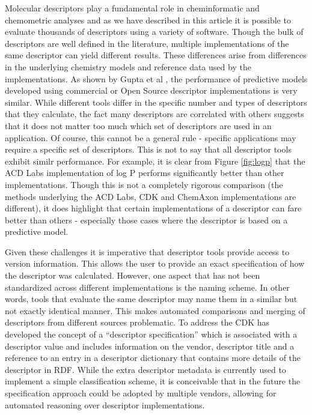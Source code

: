 \documentclass[letterpaper, 12pt]{article}
\begin{document}
Molecular descriptors play a fundamental role in cheminformatic and
chemometric analyses and as we have described in this article it is
possible to evaluate thousands of descriptors using a variety of
software. Though the bulk of descriptors are well defined in the
literature, multiple implementations of the same descriptor can yield
different results. These differences arise from differences in the
underlying chemistry models and reference data used by the
implementations. As shown by Gupta et al \cite{Gupta:2010uq},
the performance of predictive models developed using commercial or
Open Source descriptor implementations is very similar. While
different tools differ in the specific number and types of descriptors
that they calculate, the fact many descriptors are correlated with
others suggests that it does not matter too much which set of
descriptors are used in an application. Of course, this cannot be a
general rule - specific applications may require a specific set of
descriptors. This is not to say that all descriptor tools exhibit
similr performance. For example, it is clear from Figure \ref{fig:logp}
that the ACD Labs implementation of log P performs significantly
better than other implementations. Though this is not a completely
rigorous comparison (the methods underlying the ACD Labs, CDK and
ChemAxon implementations are different), it does highlight that
certain implementations of a descriptor can fare better than others -
especially those cases where the descriptor is based on a predictive
model. 

Given these challenges it is imperative that descriptor tools provide
access to version information. This allows the user to provide an
exact specification of how the descriptor was calculated. However, one
aspect that has not been standardized across different implementations
is the naming scheme. In other words, tools that evaluate the same
descriptor may name them in a similar but not exactly identical
manner. This makes automated comparisons and merging of descriptors
from different sources problematic. To address the CDK has developed
the concept of a ``descriptor specification'' which is associated with
a descriptor value and includes information on the vendor, descriptor
title and a reference to an entry in a descriptor dictionary that
contains more details of the descriptor in RDF. While the extra
descriptor metadata is currently used to implement a simple
classification scheme, it is conceivable that in the future the
specification approach could be adopted by multiple vendors, allowing
for automated reasoning over descriptor implementations.
\end{document}
